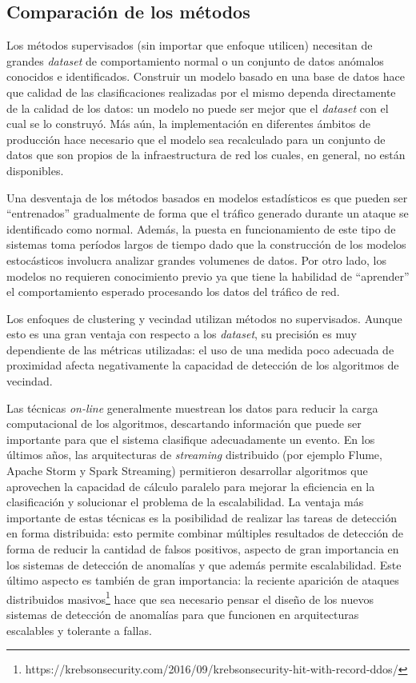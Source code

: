 \documentclass[a4paper,10pt, oneside]{article}
\begin{document}
\subsection{Comparación de los métodos}
Los métodos supervisados (sin importar que enfoque utilicen) necesitan de grandes \textit{dataset} de comportamiento normal o un conjunto de datos anómalos conocidos e identificados. Construir un modelo basado en una base de datos hace que calidad de las clasificaciones realizadas por el mismo dependa directamente de la calidad de los datos: un modelo no puede ser mejor que el \textit{dataset} con el cual se lo construyó. Más aún, la implementación en diferentes ámbitos de producción hace necesario que el modelo sea recalculado para un conjunto de datos que son propios de la infraestructura de red los cuales, en general, no están disponibles.\par
Una desventaja de los métodos basados en modelos estadísticos es que pueden ser ``entrenados'' gradualmente de forma que el tráfico generado durante un ataque se identificado como normal. Además, la puesta en funcionamiento de este tipo de sistemas toma períodos largos de tiempo dado que la construcción de los modelos estocásticos involucra analizar grandes volumenes de datos. Por otro lado, los modelos no requieren conocimiento previo ya que tiene la habilidad de ``aprender'' el comportamiento esperado procesando los datos del tráfico de red\cite{journals/comsur/BhuyanBK14}.\par
Los enfoques de clustering y vecindad utilizan métodos no supervisados. Aunque esto es una gran ventaja con respecto a los \textit{dataset}, su precisión es muy dependiente de las métricas utilizadas: el uso de una medida poco adecuada de proximidad afecta negativamente la capacidad de detección de los algoritmos de vecindad.\par
Las técnicas \textit{on-line} generalmente muestrean los datos para reducir la carga computacional de los algoritmos, descartando información que puede ser importante para que el sistema clasifique adecuadamente un evento. En los últimos años, las arquitecturas de \textit{streaming} distribuido (por ejemplo Flume\cite{apacheflume}, Apache Storm\cite{apachestorm} y Spark Streaming\cite{apachespark}) permitieron desarrollar algoritmos que aprovechen la capacidad de cálculo paralelo para mejorar la eficiencia en la clasificación y solucionar el problema de la escalabilidad\cite{huang2014ld}. La ventaja más importante de estas técnicas es la posibilidad de realizar las tareas de detección en forma distribuida: esto permite combinar múltiples resultados de detección de forma de reducir la cantidad de falsos positivos, aspecto de gran importancia en los sistemas de detección de anomalías y que además permite escalabilidad. Este último aspecto es también de gran importancia: la reciente aparición de ataques distribuidos masivos\footnote{https://krebsonsecurity.com/2016/09/krebsonsecurity-hit-with-record-ddos/} hace que sea necesario pensar el diseño de los nuevos sistemas de detección de anomalías para que funcionen en arquitecturas escalables y tolerante a fallas.
\end{document}
